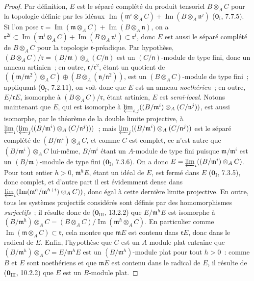 \begin{proof}
Par définition, $E$ est le séparé complété du produit tensoriel $B\otimes_A C$
pour la topologie définie par les idéaux
$\operatorname{Im}(\mathfrak m^i\otimes_A C)+
\operatorname{Im}(B\otimes_A\mathfrak n^j)$
($\mathbf 0_{\mathrm I}$, 7.7.5). Si l'on pose
$\mathfrak r=\operatorname{Im}(\mathfrak m\otimes_A C)+
\operatorname{Im}(B\otimes_A\mathfrak n)$,
on a
$\mathfrak r^{2i}\subset
\operatorname{Im}(\mathfrak m^i\otimes_A C)+
\operatorname{Im}(B\otimes_A\mathfrak n^i)\subset\mathfrak r^i$, donc $E$
est aussi le séparé complété de $B\otimes_A C$ pour la topologie
$\mathfrak r$-préadique. Par hypothèse,
$(B\otimes_A C)/\mathfrak r=(B/\mathfrak m)\otimes_A(C/\mathfrak n)$ est un
$(C/\mathfrak n)$-module de type fini, donc un anneau artinien~; en outre,
$\mathfrak r/\mathfrak r^2$, étant un quotient de
$((\mathfrak m/\mathfrak m^2)\otimes_A C)
\oplus(B\otimes_A(\mathfrak n/\mathfrak n^2))$,
est un $(B\otimes_A C)$-module de type fini~; appliquant
($\mathbf 0_{\mathrm I}$, 7.2.11), on voit donc que $E$ est un anneau
\emph{noethérien}~; en outre, $E/\mathfrak rE$, isomorphe à
$(B\otimes_A C)/\mathfrak r$, étant artinien, $E$ est \emph{semi-local}.
Notons maintenant que $E$, qui est isomorphe à
$\varprojlim_{i,j}((B/\mathfrak m^i)\otimes_A(C/\mathfrak n^j))$,
est aussi isomorphe, par le théorème de la double limite projective, à
$\varprojlim_i(\varprojlim_j
  ((B/\mathfrak m^i)\otimes_A(C/\mathfrak n^j)))$~;
mais $\varprojlim_j((B/\mathfrak m^i)\otimes_A(C/\mathfrak n^j))$
est le
séparé complété de $(B/\mathfrak m^i)\otimes_A C$, et comme $C$ est complet,
ce n'est autre que $(B/\mathfrak m^i)\otimes_A C$ lui-même,
$B/\mathfrak m^i$ étant un $A$-module de type fini puisque
$\mathfrak m/\mathfrak m^i$ est un $(B/\mathfrak m)$-module de type fini
($\mathbf 0_{\mathrm I}$, 7.3.6). On a donc
$E=\varprojlim_i((B/\mathfrak m^i)\otimes_A C)$.
Pour tout entier $h>0$, $\mathfrak m^hE$, étant un idéal de $E$, est fermé
dans $E$ ($\mathbf 0_{\mathrm I}$, 7.3.5), donc complet, et d'autre part il est
évidemment dense dans
$\varprojlim_i(\operatorname{Im}(\mathfrak m^h/\mathfrak m^{h+i})\otimes_A C))$,
donc égal à cette dernière limite projective. En outre, tous les systèmes
projectifs considérés sont définis par des homomorphismes \emph{surjectifs}~;
il résulte donc de ($\mathbf 0_{\mathrm{III}}$, 13.2.2) que
$E/\mathfrak m^hE$ est isomorphe à
$(B/\mathfrak m^h)\otimes_A C=(B\otimes_A C)/\operatorname{Im}(\mathfrak m^h\otimes_A C)$.
En particulier comme
$\operatorname{Im}(\mathfrak m\otimes_A C)\subset\mathfrak r$, cela montre
que $\mathfrak mE$ est contenu dans $\mathfrak rE$, donc dans le radical de
$E$. Enfin, l'hypothèse que $C$ est un $A$-module plat entraîne que
$(B/\mathfrak m^h)\otimes_A C=E/\mathfrak m^hE$ est un
$(B/\mathfrak m^h)$-module plat pour tout $h>0$~: comme $B$ et $E$ sont
noethériens et que $\mathfrak mE$ est contenu dans le radical de $E$, il
résulte de ($\mathbf 0_{\mathrm{III}}$, 10.2.2) que $E$ est un $B$-module
plat.
\end{proof}

